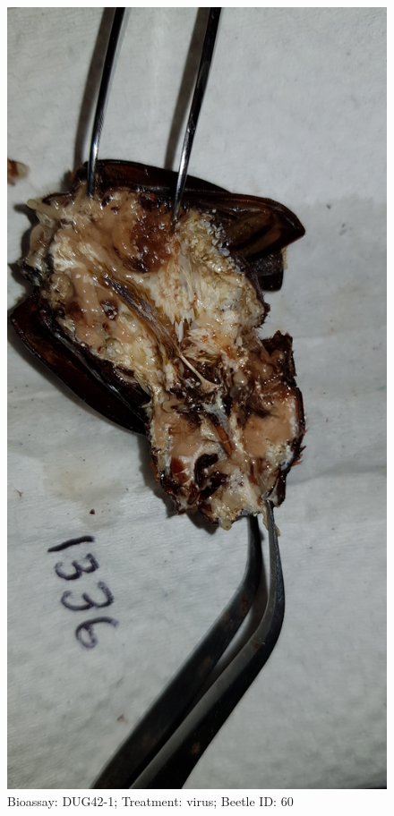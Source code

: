 \documentclass[11pt]{scrartcl}
\begin{document}
\begin{figure}[h!]
    \centering
    \includegraphics[width=\linewidth, height=\textheight, keepaspectratio]{uploads/btl.pm_image.ad66be521cf7f169.447567343220313333365f5265702d312076697275732e6a7067.jpg}
    \caption{Bioassay: DUG42-1; Treatment: virus; Beetle ID: 60}
\end{figure}
\clearpage
\end{document}
